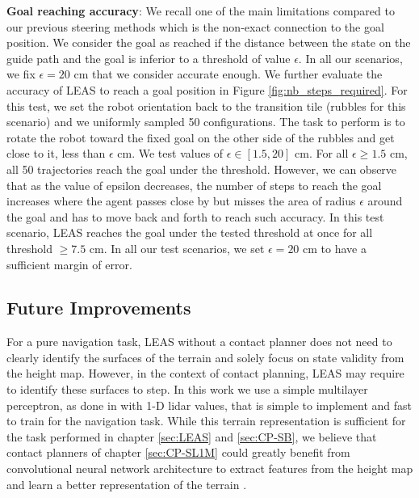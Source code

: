 \textbf{Goal reaching accuracy}:
We recall one of the main limitations compared to our previous steering methods which is the non-exact connection to the goal position. We consider the goal as reached if the distance between the state on the guide path and the goal is inferior to a threshold of value $\epsilon$. In all our scenarios, we fix $\epsilon = 20$ cm that we consider accurate enough.
We further evaluate the accuracy of LEAS to reach a goal position in Figure \ref{fig:nb_steps_required}. For this test, we set the robot orientation back to the transition tile (rubbles for this scenario) and we uniformly sampled 50 configurations. The task to perform is to rotate the robot toward the fixed goal on the other side of the rubbles and get close to it, less than $\epsilon$ cm.
We test values of $\epsilon \in [1.5, 20]$ cm. 
For all $\epsilon \geq 1.5$ cm, all 50 trajectories reach the goal under the threshold. However, we can observe that as the value of epsilon decreases, the number of steps to reach the goal increases where the agent passes close by but misses the area of radius $\epsilon$ around the goal and has to move back and forth to reach such accuracy. 
In this test scenario, LEAS reaches the goal under the tested threshold at once for all threshold $\geq 7.5 $ cm. In all our test scenarios, we set $\epsilon=20$ cm to have a sufficient margin of error.

\subsection{Future Improvements}

For a pure navigation task, LEAS without a contact planner does not need to clearly identify the surfaces of the terrain and solely focus on state validity from the height map. 
However, in the context of contact planning, LEAS may require to identify these surfaces to step.
In this work we use a simple multilayer perceptron, as done in \cite{RL_RRT, RL_RRT_AUTORL} with 1-D lidar values, that is simple to implement and fast to train for the navigation task. 
While this terrain representation is sufficient for the task performed in chapter \ref{sec:LEAS} and \ref{sec:CP-SB}, we believe that contact planners of chapter \ref{sec:CP-SL1M} could greatly benefit from convolutional neural network architecture to extract features from the height map and learn a better representation of the terrain \cite{deepLoco,deepGait,RLOC}.

